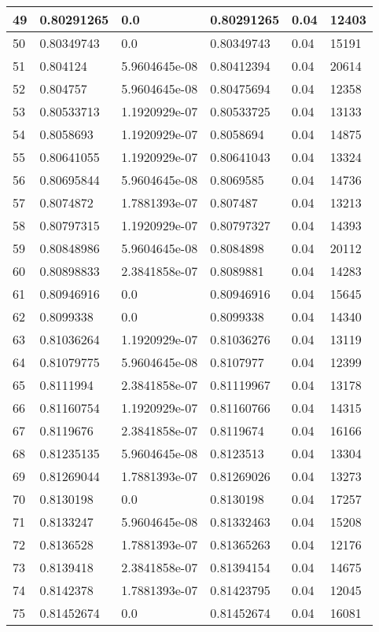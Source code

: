 \begin{longtable}{|l|l|l|l|l|l|}
49 & 0.80291265 & 0.0 & 0.80291265 & 0.04 & 12403 \\ \hline 
50 & 0.80349743 & 0.0 & 0.80349743 & 0.04 & 15191 \\ \hline 
51 & 0.804124 & 5.9604645e-08 & 0.80412394 & 0.04 & 20614 \\ \hline 
52 & 0.804757 & 5.9604645e-08 & 0.80475694 & 0.04 & 12358 \\ \hline 
53 & 0.80533713 & 1.1920929e-07 & 0.80533725 & 0.04 & 13133 \\ \hline 
54 & 0.8058693 & 1.1920929e-07 & 0.8058694 & 0.04 & 14875 \\ \hline 
55 & 0.80641055 & 1.1920929e-07 & 0.80641043 & 0.04 & 13324 \\ \hline 
56 & 0.80695844 & 5.9604645e-08 & 0.8069585 & 0.04 & 14736 \\ \hline 
57 & 0.8074872 & 1.7881393e-07 & 0.807487 & 0.04 & 13213 \\ \hline 
58 & 0.80797315 & 1.1920929e-07 & 0.80797327 & 0.04 & 14393 \\ \hline 
59 & 0.80848986 & 5.9604645e-08 & 0.8084898 & 0.04 & 20112 \\ \hline 
60 & 0.80898833 & 2.3841858e-07 & 0.8089881 & 0.04 & 14283 \\ \hline 
61 & 0.80946916 & 0.0 & 0.80946916 & 0.04 & 15645 \\ \hline 
62 & 0.8099338 & 0.0 & 0.8099338 & 0.04 & 14340 \\ \hline 
63 & 0.81036264 & 1.1920929e-07 & 0.81036276 & 0.04 & 13119 \\ \hline 
64 & 0.81079775 & 5.9604645e-08 & 0.8107977 & 0.04 & 12399 \\ \hline 
65 & 0.8111994 & 2.3841858e-07 & 0.81119967 & 0.04 & 13178 \\ \hline 
66 & 0.81160754 & 1.1920929e-07 & 0.81160766 & 0.04 & 14315 \\ \hline 
67 & 0.8119676 & 2.3841858e-07 & 0.8119674 & 0.04 & 16166 \\ \hline 
68 & 0.81235135 & 5.9604645e-08 & 0.8123513 & 0.04 & 13304 \\ \hline 
69 & 0.81269044 & 1.7881393e-07 & 0.81269026 & 0.04 & 13273 \\ \hline 
70 & 0.8130198 & 0.0 & 0.8130198 & 0.04 & 17257 \\ \hline 
71 & 0.8133247 & 5.9604645e-08 & 0.81332463 & 0.04 & 15208 \\ \hline 
72 & 0.8136528 & 1.7881393e-07 & 0.81365263 & 0.04 & 12176 \\ \hline 
73 & 0.8139418 & 2.3841858e-07 & 0.81394154 & 0.04 & 14675 \\ \hline 
74 & 0.8142378 & 1.7881393e-07 & 0.81423795 & 0.04 & 12045 \\ \hline 
75 & 0.81452674 & 0.0 & 0.81452674 & 0.04 & 16081 \\ \hline 
\end{longtable}